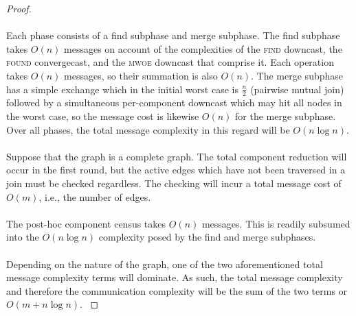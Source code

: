 \documentclass[11pt,epsf]{article}
\begin{document}
{{\begin{proof}
      \paragraph{}{
        Each phase consists of a find subphase and merge subphase. The find subphase takes $O(n)$
        messages on account of the complexities of the \textsc{find} downcast, the \textsc{found}
        convergecast, and the \textsc{mwoe} downcast that comprise it. Each operation takes $O(n)$
        messages, so their summation is also $O(n)$. The merge subphase has a simple exchange which
        in the initial worst case is $\frac{n}{2}$ (pairwise mutual join) followed by a simultaneous
        per-component downcast which may hit all nodes in the worst case, so the message cost is
        likewise $O(n)$ for the merge subphase. Over all phases, the total message complexity
        in this regard will be $O(n \log n)$.
      }
      \paragraph{}{
        Suppose that the graph is a complete graph. The total component reduction will occur in
        the first round, but the active edges which have not been traversed in a join must be
        checked regardless. The checking will incur a total message cost of $O(m)$, i.e., the
        number of edges.
      }
      \paragraph{}{
        The post-hoc component census takes $O(n)$ messages. This is readily subsumed into
        the $O(n \log n)$ complexity posed by the find and merge subphases.
      }
      \paragraph{}{
        Depending on the nature of the graph, one of the two aforementioned total message
        complexity terms will dominate. As such, the total message complexity and therefore
        the communication complexity will be the sum of the two terms or $O(m + n \log n)$.
      }
    \end{proof}
  }
}
\end{document}

